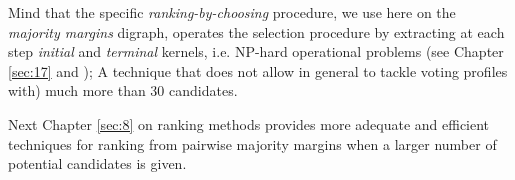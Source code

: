 Mind that the specific \emph{ranking-by-choosing} procedure, we use here on the \emph{majority margins} digraph, operates the selection procedure by extracting at each step \emph{initial} and \emph{terminal} kernels, i.e. NP-hard operational problems (see Chapter \ref{sec:17} and \citet{BIS-1999}); A technique that does not allow in general to tackle voting profiles with) much more than 30 candidates.

\vspace{1cm}

Next Chapter \ref{sec:8} on ranking methods provides more adequate and efficient techniques for ranking from pairwise majority margins when a larger number of potential candidates is given.  

\clearpage


%